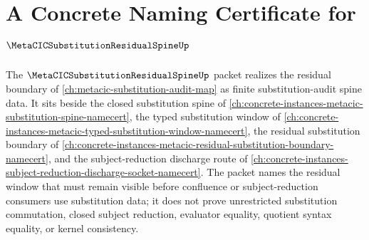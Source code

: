 \chapter{A Concrete Naming Certificate for $\MetaCICSubstitutionResidualSpineUp$}
\label{ch:concrete-instances-metacic-substitution-residual-spine-namecert}

The $\MetaCICSubstitutionResidualSpineUp$ packet realizes the residual boundary of \autoref{ch:metacic-substitution-audit-map} as finite substitution-audit spine data. It sits beside the closed substitution spine of \autoref{ch:concrete-instances-metacic-substitution-spine-namecert}, the typed substitution window of \autoref{ch:concrete-instances-metacic-typed-substitution-window-namecert}, the residual substitution boundary of \autoref{ch:concrete-instances-metacic-residual-substitution-boundary-namecert}, and the subject-reduction discharge route of \autoref{ch:concrete-instances-subject-reduction-discharge-socket-namecert}. The packet names the residual window that must remain visible before confluence or subject-reduction consumers use substitution data; it does not prove unrestricted substitution commutation, closed subject reduction, evaluator equality, quotient syntax equality, or kernel consistency.

